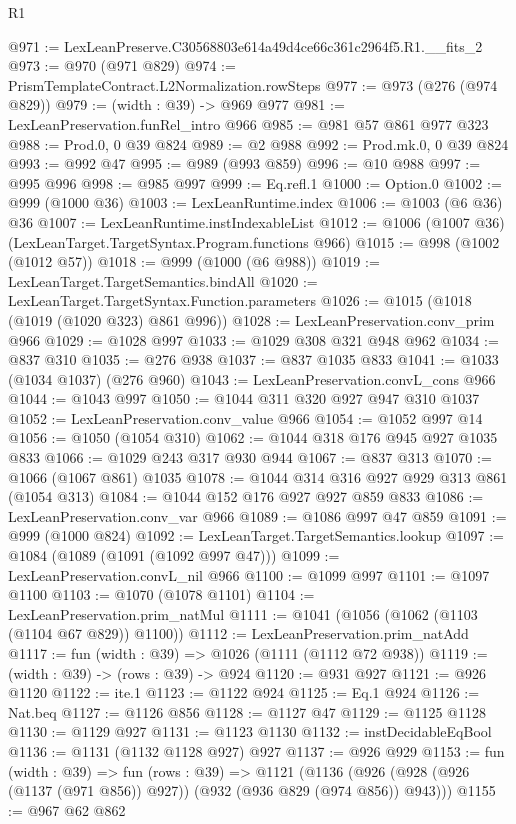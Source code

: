 \begin{lexlean}{R1}
\begin{coremodule}
@971 := LexLeanPreserve.C30568803e614a49d4ce66c361c2964f5.R1.__fits_2
@973 := @970 (@971 @829)
@974 := PrismTemplateContract.L2Normalization.rowSteps
@977 := @973 (@276 (@974 @829))
@979 := (width : @39) -> @969 @977
@981 := LexLeanPreservation.funRel_intro @966
@985 := @981 @57 @861 @977 @323
@988 := Prod.{0, 0} @39 @824
@989 := @2 @988
@992 := Prod.mk.{0, 0} @39 @824
@993 := @992 @47
@995 := @989 (@993 @859)
@996 := @10 @988
@997 := @995 @996
@998 := @985 @997
@999 := Eq.refl.{1}
@1000 := Option.{0}
@1002 := @999 (@1000 @36)
@1003 := LexLeanRuntime.index
@1006 := @1003 (@6 @36) @36
@1007 := LexLeanRuntime.instIndexableList
@1012 := @1006 (@1007 @36) (LexLeanTarget.TargetSyntax.Program.functions @966)
@1015 := @998 (@1002 (@1012 @57))
@1018 := @999 (@1000 (@6 @988))
@1019 := LexLeanTarget.TargetSemantics.bindAll
@1020 := LexLeanTarget.TargetSyntax.Function.parameters
@1026 := @1015 (@1018 (@1019 (@1020 @323) @861 @996))
@1028 := LexLeanPreservation.conv_prim @966
@1029 := @1028 @997
@1033 := @1029 @308 @321 @948 @962
@1034 := @837 @310
@1035 := @276 @938
@1037 := @837 @1035 @833
@1041 := @1033 (@1034 @1037) (@276 @960)
@1043 := LexLeanPreservation.convL_cons @966
@1044 := @1043 @997
@1050 := @1044 @311 @320 @927 @947 @310 @1037
@1052 := LexLeanPreservation.conv_value @966
@1054 := @1052 @997 @14
@1056 := @1050 (@1054 @310)
@1062 := @1044 @318 @176 @945 @927 @1035 @833
@1066 := @1029 @243 @317 @930 @944
@1067 := @837 @313
@1070 := @1066 (@1067 @861) @1035
@1078 := @1044 @314 @316 @927 @929 @313 @861 (@1054 @313)
@1084 := @1044 @152 @176 @927 @927 @859 @833
@1086 := LexLeanPreservation.conv_var @966
@1089 := @1086 @997 @47 @859
@1091 := @999 (@1000 @824)
@1092 := LexLeanTarget.TargetSemantics.lookup
@1097 := @1084 (@1089 (@1091 (@1092 @997 @47)))
@1099 := LexLeanPreservation.convL_nil @966
@1100 := @1099 @997
@1101 := @1097 @1100
@1103 := @1070 (@1078 @1101)
@1104 := LexLeanPreservation.prim_natMul
@1111 := @1041 (@1056 (@1062 (@1103 (@1104 @67 @829)) @1100))
@1112 := LexLeanPreservation.prim_natAdd
@1117 := fun (width : @39) => @1026 (@1111 (@1112 @72 @938))
@1119 := (width : @39) -> (rows : @39) -> @924
@1120 := @931 @927
@1121 := @926 @1120
@1122 := ite.{1}
@1123 := @1122 @924
@1125 := Eq.{1} @924
@1126 := Nat.beq
@1127 := @1126 @856
@1128 := @1127 @47
@1129 := @1125 @1128
@1130 := @1129 @927
@1131 := @1123 @1130
@1132 := instDecidableEqBool
@1136 := @1131 (@1132 @1128 @927) @927
@1137 := @926 @929
@1153 := fun (width : @39) =>
  fun (rows : @39) =>
  @1121 (@1136 (@926 (@928 (@926 (@1137 (@971 @856)) @927)) (@932 (@936 @829 (@974 @856)) @943)))
@1155 := @967 @62 @862

\end{coremodule}
\end{lexlean}
